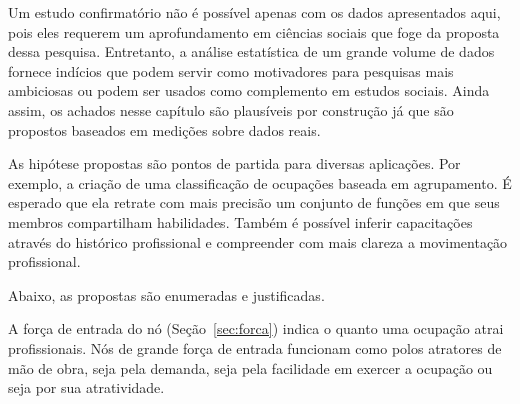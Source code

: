 \documentclass[12pt,a4paper]{article}
\begin{document}
Um estudo confirmatório não é possível apenas com os dados apresentados aqui, pois eles requerem um aprofundamento em ciências sociais que foge da proposta dessa pesquisa. Entretanto, a análise estatística de um grande volume de dados fornece indícios que podem servir como motivadores para pesquisas mais ambiciosas ou podem ser usados como complemento em estudos sociais. Ainda assim, os achados nesse capítulo são plausíveis por construção já que são propostos baseados em medições sobre dados reais.




As hipótese propostas são pontos de partida para diversas aplicações. Por exemplo, a criação de uma classificação de ocupações baseada em agrupamento. É esperado que ela retrate com mais precisão um conjunto de funções em que seus membros compartilham habilidades. Também é possível inferir capacitações através do histórico profissional e compreender com mais clareza a movimentação profissional.

Abaixo, as propostas são enumeradas e justificadas.

\begin{hypothesis}
    A força de entrada do nó (Seção~\ref{sec:forca}) indica o quanto uma ocupação atrai profissionais. Nós de grande força de entrada funcionam como polos atratores de mão de obra, seja pela demanda, seja pela facilidade em exercer a ocupação ou seja por sua atratividade.
\end{hypothesis}
\end{document}

